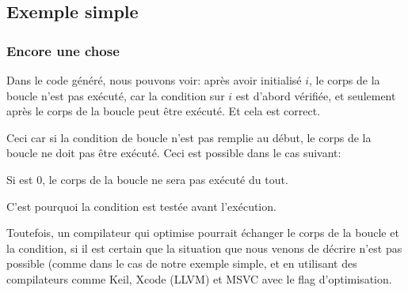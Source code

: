 \subsection{Exemple simple}





\subsubsection{Encore une chose}

Dans le code généré, nous pouvons voir:
après avoir initialisé $i$, le corps de la boucle n'est pas exécuté, car la condition
sur $i$ est d'abord vérifiée, et seulement après le corps de la boucle peut être
exécuté.
Et cela est correct.

Ceci car si la condition de boucle n'est pas remplie au début, le corps de la boucle
ne doit pas être exécuté.
Ceci est possible dans le cas suivant:



Si  est 0, le corps de la boucle ne sera
pas exécuté du tout.

C'est pourquoi la condition est testée avant l'exécution.

Toutefois, un compilateur qui optimise pourrait échanger le corps de la boucle et
la condition, si il est certain que la situation que nous venons de décrire n'est
pas possible (comme dans le cas de notre exemple simple, et en utilisant des compilateurs
comme Keil, Xcode (LLVM) et MSVC avec le flag d'optimisation.
